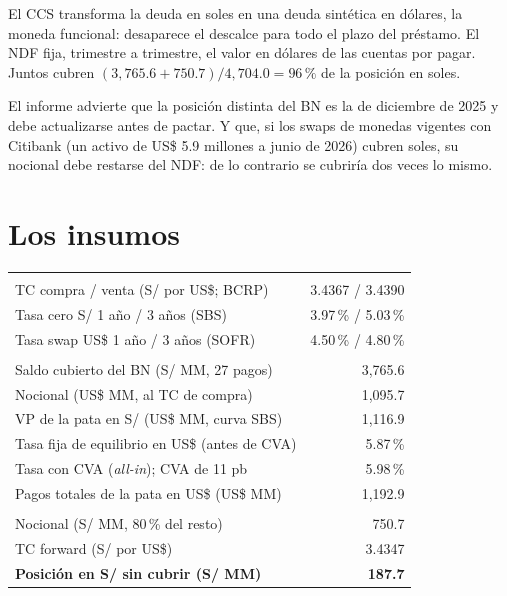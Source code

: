 \begin{intuicion}
El CCS transforma la deuda en soles en una deuda sintética en dólares, la moneda funcional: desaparece el descalce para todo el plazo del préstamo. El NDF fija, trimestre a trimestre, el valor en dólares de las cuentas por pagar. Juntos cubren $(3{,}765.6+750.7)/4{,}704.0=96\,\%$ de la posición en soles.
\end{intuicion}

\begin{informe}
El informe advierte que la posición distinta del BN es la de diciembre de 2025 y debe actualizarse antes de pactar. Y que, si los swaps de monedas vigentes con Citibank (un activo de US\$ 5.9 millones a junio de 2026) cubren soles, su nocional debe restarse del NDF: de lo contrario se cubriría dos veces lo mismo.
\end{informe}

\section{Los insumos}

\begin{center}\small
{}\label{tab:c3}
\begin{tabularx}{\linewidth}{@{}>{\raggedright\arraybackslash}Xr@{}}
\toprule
\multicolumn{2}{@{}l}{\emph{Insumos de mercado}}\\
TC compra / venta (S/ por US\$; BCRP) & 3.4367 / 3.4390\\
Tasa cero S/ 1 año / 3 años (SBS) & 3.97\,\% / 5.03\,\%\\
Tasa swap US\$ 1 año / 3 años (SOFR) & 4.50\,\% / 4.80\,\%\\
\midrule
\multicolumn{2}{@{}l}{\emph{CCS amortizable: recibe S/, paga US\$}}\\
Saldo cubierto del BN (S/ MM, 27 pagos) & 3,765.6\\
Nocional (US\$ MM, al TC de compra) & 1,095.7\\
VP de la pata en S/ (US\$ MM, curva SBS) & 1,116.9\\
Tasa fija de equilibrio en US\$ (antes de CVA) & 5.87\,\%\\
Tasa con CVA (\emph{all-in}); CVA de 11 pb & 5.98\,\%\\
Pagos totales de la pata en US\$ (US\$ MM) & 1,192.9\\
\midrule
\multicolumn{2}{@{}l}{\emph{NDF de compra de S/ a 91 días}}\\
Nocional (S/ MM, 80\,\% del resto) & 750.7\\
TC forward (S/ por US\$) & 3.4347\\
\midrule
\textbf{Posición en S/ sin cubrir (S/ MM)} & \textbf{187.7}\\
\bottomrule
\end{tabularx}
\end{center}

